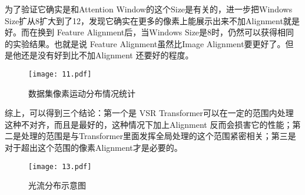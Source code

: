 为了验证它确实是和Attention Window的这个Size是有关的，进一步把Windows Size扩从8扩大到了12，发现它确实在更多的像素上能展示出来不加Alignment就是好。而在换到 Feature Alignment后，当Windows Size是8时，仍然可以获得相同的实验结果。也就是说 Feature Alignment虽然比Image Alignment要更好了。但是他还是没有好到比不加Alignment 还要好的程度。

\begin{figure}[!tbp]
\centering
\texttt{[image: 11.pdf]}	
\caption{数据集像素运动分布情况统计}
\label{fig:fig11}
\end{figure}

综上，可以得到三个结论：第一个是 VSR Transformer可以在一定的范围内处理这种不对齐，而且是最好的，这种情况下加上Alignment 反而会损害它的性能；第二是处理的范围是与Transformer里面发挥全局处理的这个范围紧密相关；第三是对于超出这个范围的像素Alignment才是必要的。

\begin{figure*}[!tbp]
	\centering
	\texttt{[image: 13.pdf]}
	\caption{光流分布示意图}
	\label{fig:fig13}
\end{figure*}

\begin{table*}[!hb]
    \footnotesize
    \caption{Comparison of VSR Transformers with different alignment methods on the REDS4 dataset.}
    \centering
    \label{tab:3-10sliding}
    \vspace{1mm}
\label{tab:tab2}
\end{table*}

